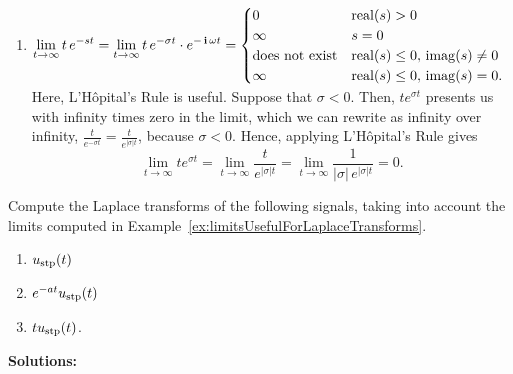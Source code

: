 \begin{enumerate}
    
     \item  \Ans \quad  $\displaystyle \lim_{t \to \infty} t\, e^{-st}   =  \lim_{t \to \infty} t\,e^{-\sigma t} \cdot e^{-\mathop{\bm{\mathrm i}} \omega t}= 
    \begin{cases} 
    0 & {\rm real}(s)>0 \\
    \infty &  s=0 \\
    \text{does not exist} & {\rm real}(s)\le0, \,  {\rm imag}(s) \neq 0\\
    \infty & {\rm real}(s)\le  0, \,  {\rm imag}(s)= 0. 
    \end{cases}$\\

    Here, L'H\^opital's Rule is useful. Suppose that $\sigma  < 0$. Then, $t e^{\sigma t} $ presents us with infinity times zero in the limit, which we can rewrite as infinity over infinity, $\frac{t}{e^{-\sigma t}} = \frac{t}{e^{|\sigma| t}}$, because $\sigma < 0$. Hence, applying  L'H\^opital's Rule gives
    $$\lim_{t \to \infty} t e^{\sigma t} = \lim_{t \to \infty} \frac{t}{e^{|\sigma| t} } =  \lim_{t \to \infty} \frac{1}{|\sigma|\,e^{|\sigma| t} } = 0.$$
\end{enumerate}

\Qed

\vspace*{.2cm} 
\begin{example} 
Compute the Laplace transforms of the following signals, taking into account the limits computed in Example~\ref{ex:limitsUsefulForLaplaceTransforms}.

 \begin{enumerate}
\renewcommand{\labelenumi}{(\alph{enumi})}
\setlength{\itemsep}{.2cm}
    \item  $u_{\rm stp}(t)$

    \item $e^{-at} u_{\rm stp}(t)$

    \item $t u_{\rm stp}(t)$.
\end{enumerate}
    
\end{example}
\textbf{Solutions:}

